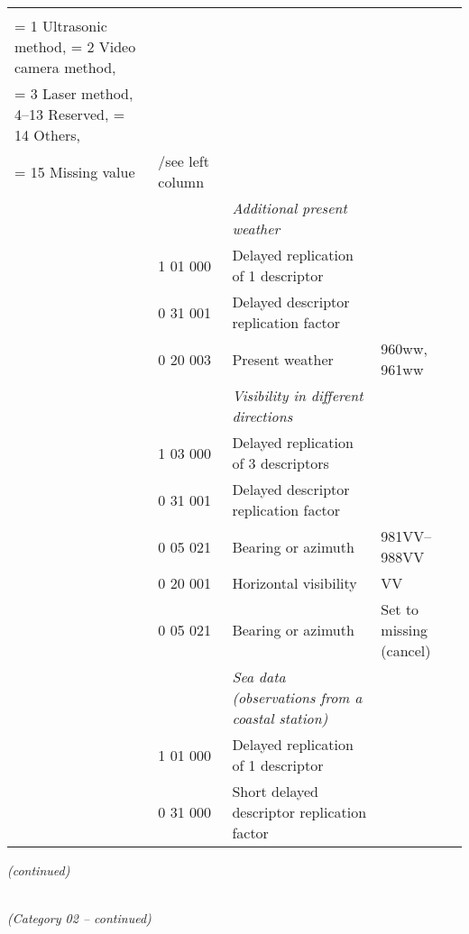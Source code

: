 \begin{longtable}[]{@{}llll@{}}
\begin{minipage}[t]{0.22\columnwidth}
\begin{quote}
= 0 Manual observation,\\
= 1 Ultrasonic method, = 2 Video camera method,\\
= 3 Laser method, 4--13 Reserved, = 14 Others,\\
= 15 Missing value
\end{quote}\strut
\end{minipage} & \begin{minipage}[t]{0.22\columnwidth}\raggedright
/see left column\strut
\end{minipage}\tabularnewline
& & \emph{Additional present weather} &\tabularnewline
& 1 01 000 & Delayed replication of 1 descriptor &\tabularnewline
& 0 31 001 & Delayed descriptor replication factor &\tabularnewline
& 0 20 003 & Present weather & 960ww, 961ww\tabularnewline
& & \emph{Visibility in different directions} &\tabularnewline
& 1 03 000 & Delayed replication of 3 descriptors &\tabularnewline
& 0 31 001 & Delayed descriptor replication factor &\tabularnewline
& 0 05 021 & Bearing or azimuth & 981VV--988VV\tabularnewline
& 0 20 001 & Horizontal visibility & VV\tabularnewline
& 0 05 021 & Bearing or azimuth & Set to missing (cancel)\tabularnewline
& & \emph{Sea data (observations from a coastal station)} &\tabularnewline
& 1 01 000 & Delayed replication of 1 descriptor &\tabularnewline
& 0 31 000 & Short delayed descriptor replication factor &\tabularnewline
\bottomrule
\end{longtable}

\emph{(continued)}

\emph{\\
(Category 02 -- continued)}

